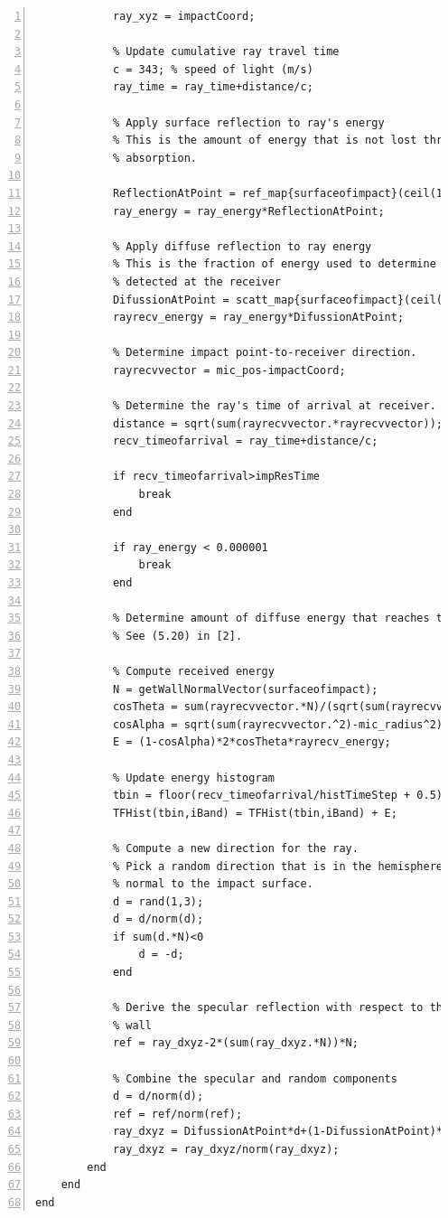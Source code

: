 \begin{lstlisting}[frame=single,numbers=left, style=Matlab-editor, basicstyle=\tiny]
            % Update ray location/source
            ray_xyz = impactCoord;

            % Update cumulative ray travel time
            c = 343; % speed of light (m/s)
            ray_time = ray_time+distance/c;

            % Apply surface reflection to ray's energy
            % This is the amount of energy that is not lost through
            % absorption.

            ReflectionAtPoint = ref_map{surfaceofimpact}(ceil(100*pointOfImpact(1)),ceil(100*pointOfImpact(2)),iBand);
            ray_energy = ray_energy*ReflectionAtPoint;

            % Apply diffuse reflection to ray energy
            % This is the fraction of energy used to determine what is
            % detected at the receiver
            DifussionAtPoint = scatt_map{surfaceofimpact}(ceil(100*pointOfImpact(1)),ceil(100*pointOfImpact(2)),iBand);
            rayrecv_energy = ray_energy*DifussionAtPoint;

            % Determine impact point-to-receiver direction.
            rayrecvvector = mic_pos-impactCoord;

            % Determine the ray's time of arrival at receiver.
            distance = sqrt(sum(rayrecvvector.*rayrecvvector));
            recv_timeofarrival = ray_time+distance/c;

            if recv_timeofarrival>impResTime
                break
            end

            if ray_energy < 0.000001
                break
            end

            % Determine amount of diffuse energy that reaches the receiver.
            % See (5.20) in [2].

            % Compute received energy
            N = getWallNormalVector(surfaceofimpact);
            cosTheta = sum(rayrecvvector.*N)/(sqrt(sum(rayrecvvector.^2)));
            cosAlpha = sqrt(sum(rayrecvvector.^2)-mic_radius^2)/sum(rayrecvvector.^2);
            E = (1-cosAlpha)*2*cosTheta*rayrecv_energy;

            % Update energy histogram
            tbin = floor(recv_timeofarrival/histTimeStep + 0.5);
            TFHist(tbin,iBand) = TFHist(tbin,iBand) + E;

            % Compute a new direction for the ray.
            % Pick a random direction that is in the hemisphere of the
            % normal to the impact surface.
            d = rand(1,3);
            d = d/norm(d);
            if sum(d.*N)<0
                d = -d;
            end

            % Derive the specular reflection with respect to the incident
            % wall
            ref = ray_dxyz-2*(sum(ray_dxyz.*N))*N;

            % Combine the specular and random components
            d = d/norm(d);
            ref = ref/norm(ref);
            ray_dxyz = DifussionAtPoint*d+(1-DifussionAtPoint)*ref;
            ray_dxyz = ray_dxyz/norm(ray_dxyz);
        end
    end
end
\end{lstlisting}
